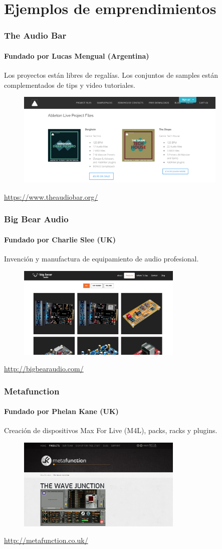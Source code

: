\documentclass[xcolor=table]{beamer}
\begin{document}
	\section{Ejemplos de emprendimientos}
	\begin{frame}
		\frametitle{The Audio Bar}
		\framesubtitle{Fundado por Lucas Mengual (Argentina)}
		Los proyectos están libres de regalías. Los conjuntos de samples están complementados de tips y video tutoriales.
		\begin{figure}[h]
    			\centering
    			\includegraphics[width=0.9\textwidth]{images/audiobar.png}
    			\label{fig:5}
    		\end{figure}
		\url{https://www.theaudiobar.org/}
	\end{frame}
	\begin{frame}
		\frametitle{Big Bear Audio}
		\framesubtitle{Fundado por Charlie Slee (UK)}
		Invención y manufactura de equipamiento de audio profesional.
		\begin{figure}[h]
    			\centering
    			\includegraphics[width=0.7\textwidth]{images/bigbearaudio.jpg}
    			\label{fig:6}
    		\end{figure}
		\url{http://bigbearaudio.com/}
	\end{frame}
	\begin{frame}
		\frametitle{Metafunction}
		\framesubtitle{Fundado por Phelan Kane (UK)}
		Creación de dispositivos Max For Live (M4L), packs, racks y plugins.
		\begin{figure}[h]
    			\centering
    			\includegraphics[width=0.7\textwidth]{images/metafunction.jpg}
    			\label{fig:7}
    		\end{figure}
		\url{http://metafunction.co.uk/}
	\end{frame}
\end{document}
